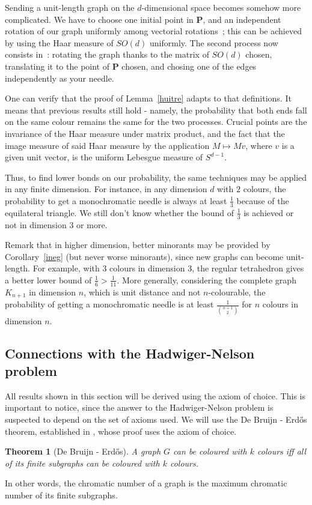 \documentclass[a4paper,11pt]{article}
\newtheorem{theo}{Theorem}
\theoremstyle{definition}
\theoremstyle{remark}
\begin{document}
Sending a unit-length graph on the $d$-dimensional space becomes somehow more 
complicated. We have to choose one initial point in $ \mathbf{P} $, and an independent 
rotation of our graph uniformly among vectorial rotations~; this can be achieved 
by using the Haar measure of $SO(d)$ uniformly. The second process now consists 
in~: rotating the graph thanks to the matrix of $SO(d)$ chosen, translating it 
to the point of $\mathbf{P}$ chosen, and chosing one of the 
edges independently as your needle.

One can verify that the proof of Lemma~\ref{huitre} adapts to that definitions. 
It means that previous results still hold - namely, the probability that both 
ends fall on the same colour remains the same for the two processes. Crucial 
points are the invariance of the Haar measure under matrix product, and the 
fact that the image measure of said Haar measure by the application 
$M\mapsto Mv$, where $v$ is a given unit vector, is the uniform Lebesgue 
measure of $S^{d-1}$.

Thus, to find lower bonds on our probability, the same techniques may be applied 
in any finite dimension. For instance, in any dimension $d$ with $2$ colours,
the probability to get a monochromatic  
needle is always at least $\frac{1}{3}$ because of the equilateral triangle. 
We still don't know whether the bound of $\frac{1}{3}$ is achieved or not in 
dimension $3$ or more. 

Remark that in higher dimension, better minorants may be provided by 
Corollary~\ref{ineg} (but never worse minorants), since new graphs can 
become unit-length. For example, with $3$ colours in dimension $3$, the regular 
tetrahedron gives a better lower bound 
of $\frac 1 6 >\frac 1 {11}$. More generally, considering the complete graph 
$K_{n+1}$ in dimension $n$, which is unit distance and not $n$-colourable, the 
probability of getting a monochromatic needle is at least $\frac{1}{\binom{n+1}{2}}$ 
for $n$ colours in dimension $n$.

\subsection{Connections with the Hadwiger-Nelson problem} \label{hn}
All results shown in this section will be derived using the axiom of choice. 
This is important to notice, since the answer to the Hadwiger-Nelson problem is 
suspected to depend on the set of axioms used. We will use the 
De Bruijn - Erd\H{o}s theorem, established in \cite{erdos}, whose proof uses 
the axiom of choice.
\begin{theo}[De Bruijn - Erdős]
 A graph $G$ can be coloured with $k$ colours iff all of its finite subgraphs 
 can be coloured with $k$ colours.
\end{theo}
In other words, the chromatic number of a graph is the maximum chromatic number 
of its finite subgraphs.
\end{document}

